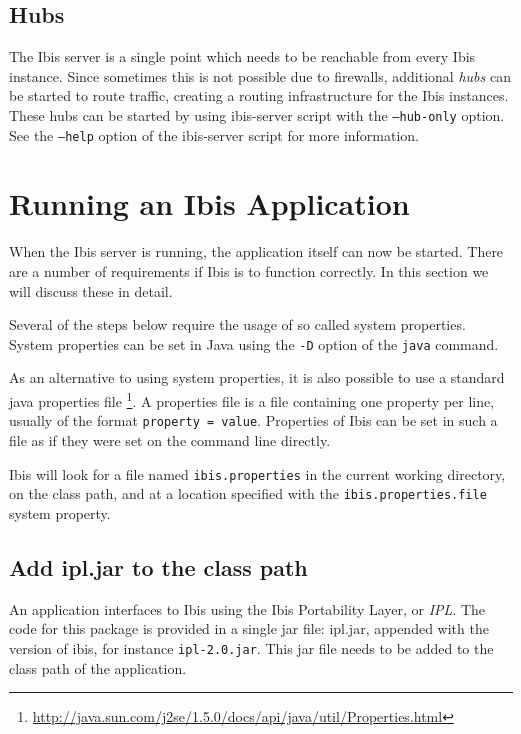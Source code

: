 \documentclass[10pt]{article}
\begin{document}
\subsection{Hubs}
\label{hubs}

The Ibis server is a single point which needs to be reachable from every
Ibis instance. Since sometimes this is not possible due to firewalls,
additional \emph{hubs} can be started to route traffic, creating a
routing infrastructure for the Ibis instances. These hubs can be started
by using ibis-server script with the \texttt{--hub-only} option. See the
\texttt{--help} option of the ibis-server script for more information.

\section{Running an Ibis Application}

When the Ibis server is running, the application itself can now be
started. There are a number of requirements if Ibis is to function
correctly. In this section we will discuss these in detail.

Several of the steps below require the usage of so called system
properties. System properties can be set in Java using the \texttt{-D}
option of the \texttt{java} command. 

As an alternative to using system properties, it is also possible to use
a standard java properties file
\footnote{\url{http://java.sun.com/j2se/1.5.0/docs/api/java/util/Properties.html}}.
A properties file is a file containing one property per line, usually of
the format \texttt{property = value}. Properties of Ibis can be set in
such a file as if they were set on the command line directly.

Ibis will look for a file named \texttt{ibis.properties} in the current working
directory, on the class path, and at a location specified with the
\texttt{ibis.properties.file} system property.

\subsection{Add ipl.jar to the class path}

An application interfaces to Ibis using the Ibis Portability Layer, or
\emph{IPL}. The code for this package is provided in a single jar file:
ipl.jar, appended with the version of ibis, for instance \texttt{ipl-2.0.jar}.
This jar file needs to be added to the class path of the application.
\end{document}
